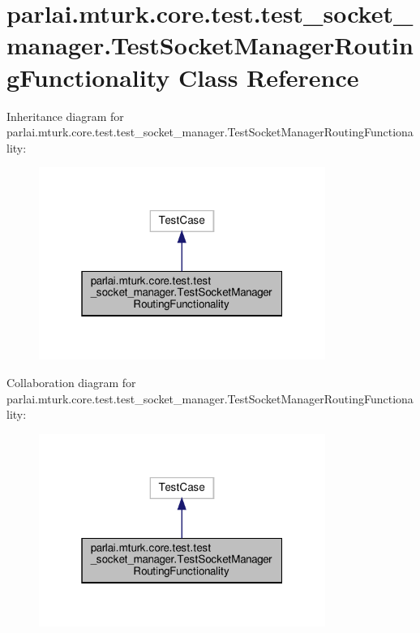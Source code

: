 \hypertarget{classparlai_1_1mturk_1_1core_1_1test_1_1test__socket__manager_1_1TestSocketManagerRoutingFunctionality}{}\section{parlai.\+mturk.\+core.\+test.\+test\+\_\+socket\+\_\+manager.\+Test\+Socket\+Manager\+Routing\+Functionality Class Reference}
\label{classparlai_1_1mturk_1_1core_1_1test_1_1test__socket__manager_1_1TestSocketManagerRoutingFunctionality}


Inheritance diagram for parlai.\+mturk.\+core.\+test.\+test\+\_\+socket\+\_\+manager.\+Test\+Socket\+Manager\+Routing\+Functionality\+:
\nopagebreak
\begin{figure}[H]
\begin{center}
\leavevmode
\includegraphics[width=265pt]{db/d6b/classparlai_1_1mturk_1_1core_1_1test_1_1test__socket__manager_1_1TestSocketManagerRoutingFunctionality__inherit__graph}
\end{center}
\end{figure}


Collaboration diagram for parlai.\+mturk.\+core.\+test.\+test\+\_\+socket\+\_\+manager.\+Test\+Socket\+Manager\+Routing\+Functionality\+:
\nopagebreak
\begin{figure}[H]
\begin{center}
\leavevmode
\includegraphics[width=265pt]{dc/d51/classparlai_1_1mturk_1_1core_1_1test_1_1test__socket__manager_1_1TestSocketManagerRoutingFunctionality__coll__graph}
\end{center}
\end{figure}
